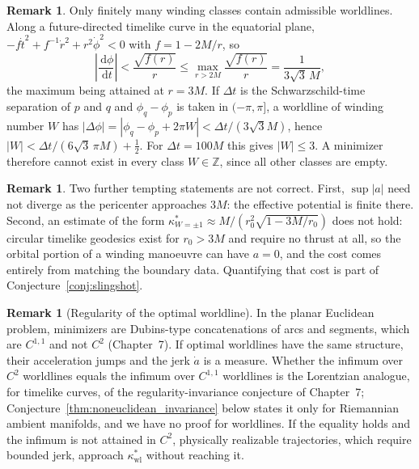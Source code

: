 \documentclass[11pt,reqno]{amsart}
\theoremstyle{definition}
\newtheorem{remark}[theorem]{Remark}
\providecommand{\dif}{\,\mathrm{d}}
\numberwithin{equation}{section}
\begin{document}
\begin{remark}
Only finitely many winding classes contain admissible worldlines. Along a future-directed timelike curve in the equatorial plane, $-f\dot t^2 + f^{-1}\dot r^2 + r^2\dot\phi^2 < 0$ with $f = 1 - 2M/r$, so
\[
\left|\frac{\dif\phi}{\dif t}\right| < \frac{\sqrt{f(r)}}{r} \le \max_{r > 2M}\frac{\sqrt{f(r)}}{r} = \frac{1}{3\sqrt3\, M},
\]
the maximum being attained at $r = 3M$. If $\Delta t$ is the Schwarzschild-time separation of $p$ and $q$ and $\phi_q - \phi_p$ is taken in $(-\pi, \pi]$, a worldline of winding number $W$ has $|\Delta\phi| = |\phi_q - \phi_p + 2\pi W| < \Delta t/(3\sqrt3 M)$, hence $|W| < \Delta t/(6\sqrt3\,\pi M) + \tfrac12$. For $\Delta t = 100M$ this gives $|W| \le 3$. A minimizer therefore cannot exist in every class $W \in \mathbb{Z}$, since all other classes are empty.
\end{remark}

\begin{remark}
Two further tempting statements are not correct. First, $\sup|a|$ need not diverge as the pericenter approaches $3M$: the effective potential is finite there. Second, an estimate of the form $\kappa^*_{W=\pm1} \approx M/(r_0^2\sqrt{1 - 3M/r_0})$ does not hold: circular timelike geodesics exist for $r_0 > 3M$ and require no thrust at all, so the orbital portion of a winding manoeuvre can have $a = 0$, and the cost comes entirely from matching the boundary data. Quantifying that cost is part of Conjecture~\ref{conj:slingshot}.
\end{remark}

\begin{remark}[Regularity of the optimal worldline]
\label{rem:worldline_regularity}
In the planar Euclidean problem, minimizers are Dubins-type concatenations of arcs and segments, which are $C^{1,1}$ and not $C^2$ (Chapter~7). If optimal worldlines have the same structure, their acceleration jumps and the jerk $\dot a$ is a measure. Whether the infimum over $C^2$ worldlines equals the infimum over $C^{1,1}$ worldlines is the Lorentzian analogue, for timelike curves, of the regularity-invariance conjecture of Chapter~7; Conjecture~\ref{thm:noneuclidean_invariance} below states it only for Riemannian ambient manifolds, and we have no proof for worldlines. If the equality holds and the infimum is not attained in $C^2$, physically realizable trajectories, which require bounded jerk, approach $\kappa^*_{\mathrm{wl}}$ without reaching it.
\end{remark}
\end{document}
